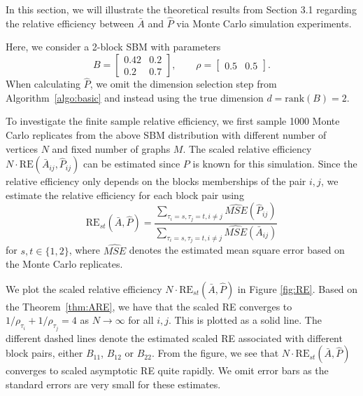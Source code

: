 \documentclass[a4paper]{article}
\begin{document}
In this section, we will illustrate the theoretical results from Section 3.1 regarding the relative efficiency between $\bar{A}$ and $\hat{P}$ via Monte Carlo simulation experiments.

Here, we consider a 2-block SBM with parameters
\begin{equation*}
B = \begin{bmatrix}
0.42 & 0.2 \\
0.2 & 0.7
\end{bmatrix}
,\qquad \rho = \begin{bmatrix}
0.5 & 0.5
\end{bmatrix}.
\end{equation*}
When calculating $\hat{P}$, we omit the dimension selection step from Algorithm~\ref{algo:basic} and instead using the true dimension $d = \mathrm{rank}(B) = 2$.

To investigate the finite sample relative efficiency, we first sample 1000 Monte Carlo replicates from the above SBM distribution with different number of vertices $N$ and fixed number of graphs $M$. The scaled relative efficiency $N \cdot \mathrm{RE}(\bar{A}_{ij}, \hat{P}_{ij})$ can be estimated since $P$ is known for this simulation. Since the relative efficiency only depends on the blocks memberships of the pair $i,j$, we estimate the relative efficiency for each block pair using
\[
	\mathrm{RE}_{st}(\bar{A},\hat{P}) = \frac{\sum_{\tau_i=s,\tau_j=t,i \ne j} \widehat{MSE}(\hat{P}_{ij})}{\sum_{\tau_i=s,\tau_j=t,i \ne j} \widehat{MSE}(\bar{A}_{ij})}
\]
for $s,t\in\{1,2\}$, where $\hat{MSE}$ denotes the estimated mean square error based on the Monte Carlo replicates.

We plot the scaled relative efficiency $N \cdot \mathrm{RE}_{st}(\bar{A},\hat{P})$ in Figure \ref{fig:RE}. 
Based on the Theorem~\ref{thm:ARE}, we have that the scaled RE converges to $1/\rho_{\tau_i}+1/\rho_{\tau_j}=4$ as $N\to\infty$ for all $i,j$.
This is plotted as a solid line.
The different dashed lines denote the estimated scaled RE associated with different block pairs, either $B_{11}$, $B_{12}$ or $B_{22}$. 
From the figure, we see that $N \cdot \mathrm{RE}_{st}(\bar{A}, \hat{P})$ converges to scaled asymptotic RE quite rapidly.
We omit error bars as the standard errors are very small for these estimates.
\end{document}
